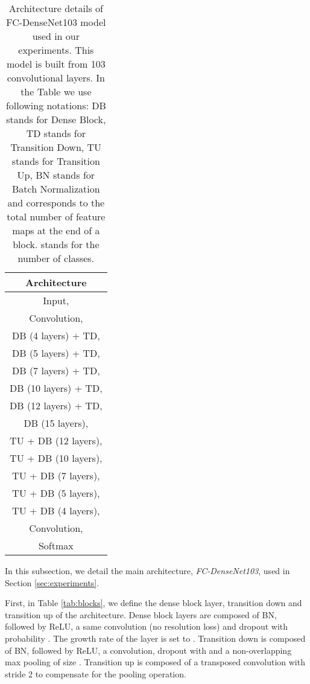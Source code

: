 \documentclass[10pt,twocolumn,letterpaper]{article}
\begin{document}
\begin{table}[!b]
    \begin{minipage}{\linewidth}
\centering
      \begin{tabular}{| c |}
      \hline 
  	  \multicolumn{1}{|c|}{\textbf{Architecture}}\\ \hline   \hline 
      \multicolumn{1}{|c|}{Input, } \\ \hline 
      \multicolumn{1}{|c|}{ Convolution, }\\ \hline 
  
DB (4 layers) + TD,  \\ \hline 
      DB (5 layers) + TD,  \\ \hline 
      DB (7 layers) + TD,  \\ \hline 
      DB (10 layers) + TD,  \\ \hline 
      DB (12 layers) + TD,  \\ \hline 
      \multicolumn{1}{|c|}{DB (15 layers), } \\ \hline 
  
TU + DB (12 layers),  \\ \hline 
      TU + DB (10 layers),  \\\hline 
      TU + DB (7 layers),  \\ \hline 
      TU + DB (5 layers),  \\ \hline 
      TU + DB (4 layers), \\ \hline
\multicolumn{1}{|c|}{ Convolution, } \\ \hline 
      \multicolumn{1}{|c|}{Softmax} \\ \hline 
      \end{tabular}
    \end{minipage}\vspace{0.2cm}
\caption{Architecture details of FC-DenseNet103 model used in our experiments. This model is built from 103 convolutional layers. In the Table we use following notations: DB stands for Dense Block, TD stands for Transition Down, TU stands for Transition Up, BN stands for Batch Normalization and  corresponds to the total number of feature maps at the end of a block.  stands for the number of classes.}
\label{tab:architecture}
\end{table}



In this subsection, we detail the main architecture, \textit{FC-DenseNet103}, used in Section \ref{sec:experiments}. 

First, in Table \ref{tab:blocks}, we define the dense block layer, transition down and transition up of the architecture. Dense block layers are composed of BN, followed by ReLU, a  same convolution (no resolution loss) and dropout with probability . The growth rate of the layer is set to . Transition down is composed of BN, followed by ReLU, a  convolution, dropout with  and a non-overlapping max pooling of size . Transition up is composed of a  transposed convolution with stride 2 to compensate for the pooling operation.
\end{document}

